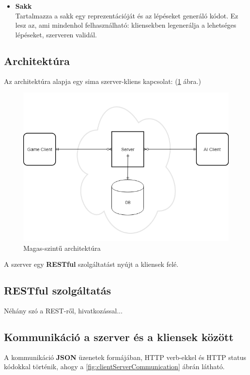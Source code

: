\documentclass[twoside, a4paper, 12pt]{article}
\begin{document}
\begin{itemize}
\begin{itemize}
		\item \textbf{Sakk} \\
		Tartalmazza a sakk egy reprezentációját és az lépéseket generáló kódot. Ez lesz az, ami mindenhol felhasználható: kliensekben legenerálja a lehetséges lépéseket, szerveren validál.
	\end{itemize}
	
\end{itemize}


\subsection{Architektúra}
Az architektúra alapja egy sima szerver-kliens kapcsolat: (\ref{fig:highLevelArchitecture} ábra.)

\begin{figure}[htbp]
	\centering
	\includegraphics[width=1.0\textwidth]{img/highLevelArchitecture.png}
	\caption{Magas-szintű architektúra}
	\label{fig:highLevelArchitecture}
\end{figure}

A szerver egy \textbf{RESTful} szolgáltatást nyújt a kliensek felé.

\subsection{RESTful szolgáltatás}
Néhány szó a REST-ről, hivatkozással...

\subsection{Kommunikáció a szerver és a kliensek között}
A kommunikáció \textbf{JSON} üzenetek formájában, HTTP verb-ekkel és HTTP status kódokkal történik, ahogy a \ref{fig:clientServerCommunication} ábrán látható.
\end{document}
